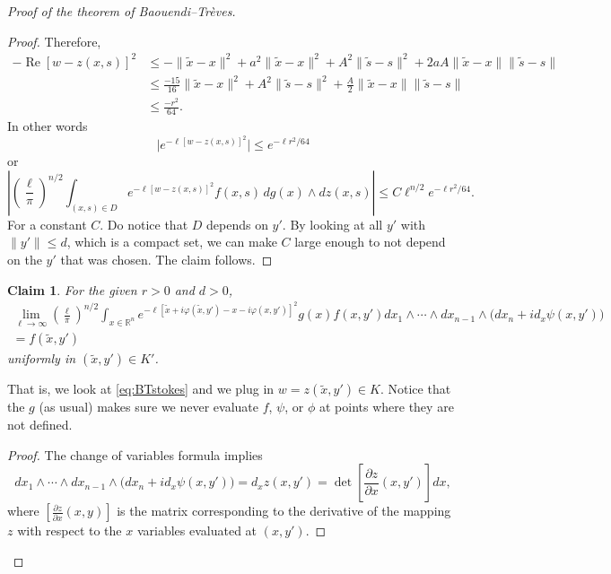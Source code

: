\documentclass[12pt,openany]{book}
\renewcommand{\Re}{\operatorname{Re}}
\newcommand{\snorm}[1]{\lVert {#1} \rVert}
\newcommand{\babs}[1]{\bigl\lvert {#1} \bigr\rvert}
\newcommand{\abs}[1]{\left\lvert {#1} \right\rvert}
\newcommand{\R}{{\mathbb{R}}}
\theoremstyle{plain}
\newtheorem{claim}[thm]{Claim}
\theoremstyle{remark}
\theoremstyle{definition}
\theoremstyle{exercise}
\theoremstyle{example}
\begin{document}
\begin{proof}[Proof of the theorem of Baouendi--Tr{\`e}ves]
\begin{proof}
Therefore,
\begin{equation*}
\begin{split}
-\Re {[w - z(x,s)]}^2 & \leq
- \snorm{\tilde{x}-x}^2
+
a^2 \snorm{\tilde{x}-x}^2
+
A^2 \snorm{\tilde{s}-s}^2
+
2aA \snorm{\tilde{x}-x}\snorm{\tilde{s}-s}
\\
& \leq
\frac{-15}{16} \snorm{\tilde{x}-x}^2
+
A^2 \snorm{\tilde{s}-s}^2
+
\frac{A}{2} \snorm{\tilde{x}-x}\snorm{\tilde{s}-s}
\\
& \leq \frac{-r^2}{64} .
\end{split}
\end{equation*}
In other words
\begin{equation*}
\babs{
e^{-\ell[w-z(x,s)]^2}}
\leq
e^{-\ell r^2  / 64}
\end{equation*}
or
\begin{equation*}
\abs{
{\left(\frac{\ell}{\pi}\right)}^{n/2}
\int_{(x,s)\in D}
e^{-\ell [w - z(x,s)]^2} f(x,s)
\,
dg(x) 
\wedge
dz(x,s)
}
\leq
C
\ell^{n/2}
e^{-\ell r^2  / 64} .
\end{equation*}
For a constant $C$.  Do notice that $D$ depends on $y'$.  By looking at all
$y'$ with $\snorm{y'} \leq d$, which
is a compact set, we can make $C$
large enough to not depend on the $y'$ that was chosen.
The claim follows.
\end{proof}

\begin{claim}
For the given $r>0$ and $d>0$,
\begin{multline*}
\lim_{\ell\to\infty}
{\left(\frac{\ell}{\pi}\right)}^{n/2}
\int_{x \in \R^n}
e^{  -\ell [\tilde{x}+i\varphi(\tilde{x},y') - x-i\varphi(x,y')]^2 } g(x) f(x,y')
dx_1  \wedge
\cdots \wedge
dx_{n-1}
\wedge
\bigl(dx_{n} + i d_x \psi (x,y') \bigr) 
\\
= f(\tilde{x},y')
\end{multline*}
uniformly in $(\tilde{x},y') \in K'$.
\end{claim}

That is, we look at \eqref{eq:BTstokes} and we plug in $w = z(\tilde{x},y') \in K$.
Notice that the $g$ (as usual) makes sure we never evaluate $f$, $\psi$, or
$\phi$ at
points where they are not defined.

\begin{proof}
The change of variables formula implies
\begin{equation}
dx_1  \wedge
\cdots \wedge
dx_{n-1}
\wedge
\bigl(dx_{n} + i d_x \psi (x,y') \bigr) 
=
d_x z(x,y')
=
\det \left[\frac{\partial z}{\partial x}(x,y')\right] dx ,
\end{equation}
where $\left[\frac{\partial z}{\partial x}(x,y)\right]$ is the matrix
corresponding to the derivative of the mapping $z$ with respect to the $x$
variables evaluated at $(x,y')$.


\end{proof}
\end{proof}
\end{document}
